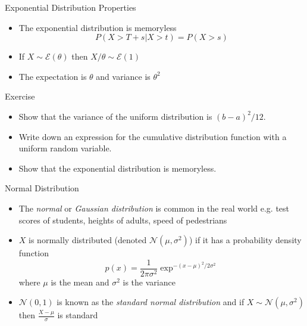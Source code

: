 \documentclass{beamer}
\begin{document}
\begin{frame}{Exponential Distribution Properties}
\begin{itemize} 
 \item The exponential distribution is memoryless 
 \begin{displaymath}
  P(X > T + s | X > t) = P(X > s)
 \end{displaymath}
\item If $X \sim \mathcal{E}(\theta)$ then $X/\theta \sim \mathcal{E}(1)$
\item The expectation is $\theta$ and variance is $\theta^2$ 
\end{itemize}
\end{frame}


\begin{frame}{Exercise} 
\begin{itemize} 
 \item Show that the variance of the uniform distribution is $(b-a)^2/12$. 
 \item Write down an expression for the cumulative distribution function with a uniform random variable.
 \item Show that the exponential distribution is memoryless. 
\end{itemize}
\end{frame}



\begin{frame}{Normal Distribution}  
\begin{itemize} 
 \item The \emph{normal} or \emph{Gaussian distribution} is common in the real world e.g. test scores of students, heights of adults, speed of pedestrians 
\item $X$ is normally distributed (denoted $\mathcal{N}(\mu, \sigma^2)$) if it has a probability density function 
\begin{displaymath} 
 p(x) = \frac{1}{2\pi\sigma^2}\exp^{-(x-\mu)^2/2\sigma^2} 
\end{displaymath}
where $\mu$ is the mean and $\sigma^2$ is the variance
\item $\mathcal{N}(0, 1)$ is known as the \emph{standard normal distribution} and if $X \sim \mathcal{N}(\mu, \sigma^2)$ then $\frac{X-\mu}{\sigma}$ is standard 
\end{itemize}
\end{frame}
\end{document}
